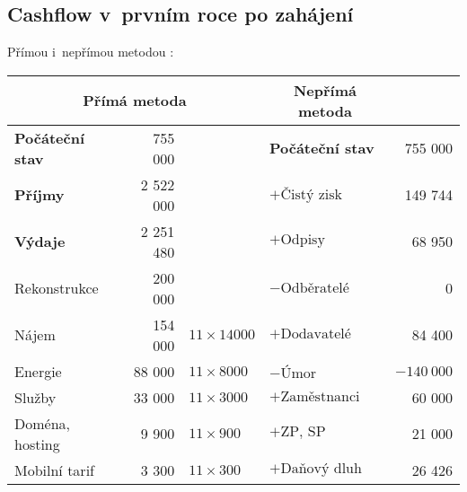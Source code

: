 \newpage

\subsection{Cashflow v~prvním roce po zahájení}
Přímou i~nepřímou metodou \cite{synek_kislingerova}:

\begin{table}[htbp]
\begin{center}
\begin{tabular}{ l r l l r }
\multicolumn{3}{c}{\textbf{Přímá metoda}}                               & \multicolumn{1}{c}{\textbf{Nepřímá metoda}} &                          \\ \hline
\textbf{Počáteční stav}                    & 755 000            &                   & \textbf{Počáteční stav}                           & 755 000            \\
\textbf{Příjmy}                            & 2 522 000          &                   & $+\text{Čistý zisk}$                              & 149 744            \\
\textbf{Výdaje}                            & 2 251 480          &                   & $+\text{Odpisy}$                                  & 68 950             \\
\hspace{0,5cm}Rekonstrukce                 & 200 000            &                   & $-\text{Odběratelé}$                              & 0                  \\
\hspace{0,5cm}Nájem                        & 154 000            & $11 \times 14000$ & $+\text{Dodavatelé}$                              & 84 400             \\
\hspace{0,5cm}Energie                      & 88 000             & $11 \times 8000$  & $-\text{Úmor}$                                    & $-140~000$         \\
\hspace{0,5cm}Služby                       & 33 000             & $11 \times 3000$  & $+\text{Zaměstnanci}$                             & 60 000             \\
\hspace{0,5cm}Doména, hosting              & 9 900              & $11 \times 900$   & $+\text{ZP, SP}$                                  & 21 000             \\
\hspace{0,5cm}Mobilní tarif                & 3 300              & $11 \times 300$   & $+\text{Daňový dluh}$                             & 26 426             \\

\end{tabular}
\end{center}
\end{table}
